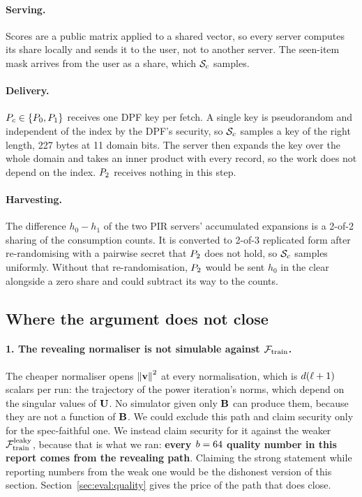 \paragraph{Serving.} Scores are a public matrix applied to a shared vector, so
every server computes its share locally and sends it to the user, not to another
server. The seen-item mask arrives from the user as a share, which $\mathcal{S}_c$
samples.

\paragraph{Delivery.} $P_{c} \in \{P_{0}, P_{1}\}$ receives one DPF
key per fetch. A single key is pseudorandom and independent of the index by the
DPF's security, so $\mathcal{S}_c$ samples a key of the right length, 227 bytes at 11
domain bits. The server then expands the key over the whole domain and takes an
inner product with every record, so the work does not depend on the index.
$P_{2}$ receives nothing in this step.

\paragraph{Harvesting.} The difference $h_0 - h_1$ of the two PIR servers'
accumulated expansions is a 2-of-2 sharing of the consumption counts. It is
converted to 2-of-3 replicated form after re-randomising with a pairwise secret
that $P_{2}$ does not hold, so $\mathcal{S}_c$ samples uniformly. Without that
re-randomisation, $P_{2}$ would be sent $h_0$ in the clear alongside a zero
share and could subtract its way to the counts.

\subsection{Where the argument does not close}
\label{sec:threat:gaps}

\paragraph{1. The revealing normaliser is not simulable against $\mathcal{F}_{\mathrm{train}}$.} The
cheaper normaliser opens $\left\lVert\mathbf{v}\right\rVert^2$ at every normalisation, which is
$d(\ell + 1)$ scalars per run: the
trajectory of the power iteration's norms, which depend on the singular values of
$\mathbf{U}$. No simulator given only $\mathbf{B}$ can produce them, because they
are not a function of $\mathbf{B}$. We could exclude this path and claim
security only for the spec-faithful one. We instead claim security for it
against the weaker $\mathcal{F}_{\mathrm{train}}^{\mathrm{leaky}}$, because that is what we ran: \textbf{every
$b = 64$ quality number in this report comes from the revealing path}.
Claiming the strong statement while reporting numbers from the weak one would be
the dishonest version of this section. Section~\ref{sec:eval:quality} gives the
price of the path that does close.

